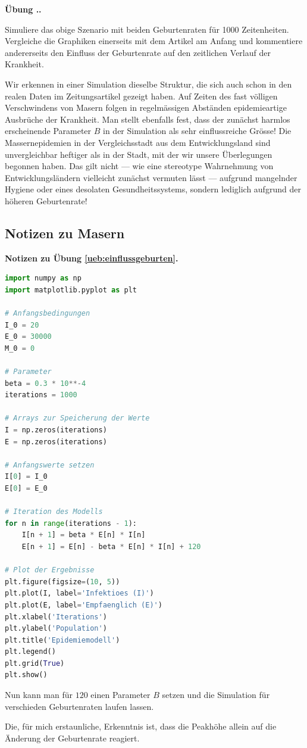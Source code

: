 \documentclass[%
11pt,%
twoside,%
titlepage,%
german,%
headsepline%
]{scrartcl}
\newcommand{\faEyeLightGray}{\textcolor{lightgray}{\faEye}} %
\newcommand{\concatueb}[1]{ueb:#1}%
\newcommand{\concatlsg}[1]{lsg:#1}%
\newcounter{uebcounter}[section]
\renewcommand{\theuebcounter}{\thesection.\arabic{uebcounter}}  %
\newenvironment{lsg}[1]{%
    \par\noindent\textbf{Notizen zu Übung \ref{\concatueb{#1}}.}%
    \label{\concatlsg{#1}}
}{%
    \par%
}
\newenvironment{uebenv}[1]{%
    \refstepcounter{uebcounter}
    \par\noindent\textbf{Übung \theuebcounter.}%
    \label{\concatueb{#1}}\hfill\hyperref[\concatlsg{#1}]{\faEyeLightGray}\par
}{%
    \par
}
\begin{document}
\begin{uebenv}{einflussgeburten}
Simuliere das obige Szenario mit beiden Geburtenraten für 1000 Zeitenheiten. Vergleiche die Graphiken einerseits mit dem Artikel am Anfang und kommentiere andererseits den Einfluss der Geburtenrate auf den zeitlichen Verlauf der Krankheit.
\end{uebenv}

Wir erkennen in einer Simulation dieselbe Struktur, die sich auch schon in den realen Daten im Zeitungsartikel gezeigt haben. Auf Zeiten des fast völligen Verschwindens von Masern folgen in regelmässigen Abständen epidemieartige Ausbrüche der Krankheit. Man stellt ebenfalls fest, dass der zunächst harmlos erscheinende Parameter $B$ in der Simulation als sehr einflussreiche Grösse! Die Massernepidemien in der Vergleichsstadt aus dem Entwicklungsland sind unvergleichbar heftiger als in der Stadt, mit der wir unsere Überlegungen begonnen haben. Das gilt nicht --- wie eine stereotype Wahrnehmung von Entwicklungsländern vielleicht zunächst vermuten lässt --- aufgrund mangelnder Hygiene oder eines desolaten Gesundheitssystems, sondern lediglich aufgrund der höheren Geburtenrate!

\clearpage

\subsection{Notizen zu Masern}

\begin{lsg}{einflussgeburten}
    \begin{lstlisting}[language=python]
        import numpy as np
import matplotlib.pyplot as plt

# Anfangsbedingungen
I_0 = 20
E_0 = 30000
M_0 = 0

# Parameter
beta = 0.3 * 10**-4
iterations = 1000

# Arrays zur Speicherung der Werte
I = np.zeros(iterations)
E = np.zeros(iterations)

# Anfangswerte setzen
I[0] = I_0
E[0] = E_0

# Iteration des Modells
for n in range(iterations - 1):
    I[n + 1] = beta * E[n] * I[n]
    E[n + 1] = E[n] - beta * E[n] * I[n] + 120

# Plot der Ergebnisse
plt.figure(figsize=(10, 5))
plt.plot(I, label='Infektioes (I)')
plt.plot(E, label='Empfaenglich (E)')
plt.xlabel('Iterations')
plt.ylabel('Population')
plt.title('Epidemiemodell')
plt.legend()
plt.grid(True)
plt.show()
    \end{lstlisting}

    Nun kann man für $120$ einen Parameter $B$ setzen und die Simulation für verschieden Geburtenraten laufen lassen.

    Die, für mich erstaunliche, Erkenntnis ist, dass die Peakhöhe allein auf die Änderung der Geburtenrate reagiert.
\end{lsg}
\end{document}
